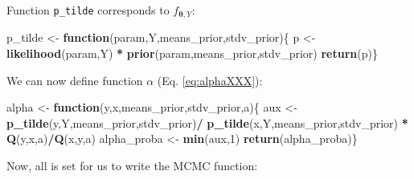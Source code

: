 \documentclass[
  12pt,
]{book}
\newenvironment{Shaded}{\begin{snugshade}}{\end{snugshade}}
\newcommand{\ControlFlowTok}[1]{\textcolor[rgb]{0.13,0.29,0.53}{\textbf{#1}}}
\newcommand{\DecValTok}[1]{\textcolor[rgb]{0.00,0.00,0.81}{#1}}
\newcommand{\FunctionTok}[1]{\textcolor[rgb]{0.13,0.29,0.53}{\textbf{#1}}}
\newcommand{\NormalTok}[1]{#1}
\newcommand{\OtherTok}[1]{\textcolor[rgb]{0.56,0.35,0.01}{#1}}
\newcommand{\SpecialCharTok}[1]{\textcolor[rgb]{0.81,0.36,0.00}{\textbf{#1}}}
\theoremstyle{definition}
\theoremstyle{definition}
\theoremstyle{definition}
\theoremstyle{definition}
\theoremstyle{remark}
\begin{document}
Function \texttt{p\_tilde} corresponds to \(f_{{\boldsymbol\theta},Y}\):

\begin{Shaded}
\begin{Highlighting}[]
\NormalTok{p\_tilde }\OtherTok{\textless{}{-}} \ControlFlowTok{function}\NormalTok{(param,Y,means\_prior,stdv\_prior)\{}
\NormalTok{  p }\OtherTok{\textless{}{-}} \FunctionTok{likelihood}\NormalTok{(param,Y) }\SpecialCharTok{*} \FunctionTok{prior}\NormalTok{(param,means\_prior,stdv\_prior)}
  \FunctionTok{return}\NormalTok{(p)\}}
\end{Highlighting}
\end{Shaded}

We can now define function \(\alpha\) (Eq. \eqref{eq:alphaXXX}):

\begin{Shaded}
\begin{Highlighting}[]
\NormalTok{alpha }\OtherTok{\textless{}{-}} \ControlFlowTok{function}\NormalTok{(y,x,means\_prior,stdv\_prior,a)\{}
\NormalTok{  aux }\OtherTok{\textless{}{-}} \FunctionTok{p\_tilde}\NormalTok{(y,Y,means\_prior,stdv\_prior)}\SpecialCharTok{/}
    \FunctionTok{p\_tilde}\NormalTok{(x,Y,means\_prior,stdv\_prior) }\SpecialCharTok{*} \FunctionTok{Q}\NormalTok{(y,x,a)}\SpecialCharTok{/}\FunctionTok{Q}\NormalTok{(x,y,a)}
\NormalTok{  alpha\_proba }\OtherTok{\textless{}{-}} \FunctionTok{min}\NormalTok{(aux,}\DecValTok{1}\NormalTok{)}
  \FunctionTok{return}\NormalTok{(alpha\_proba)\}}
\end{Highlighting}
\end{Shaded}

Now, all is set for us to write the MCMC function:
\end{document}
